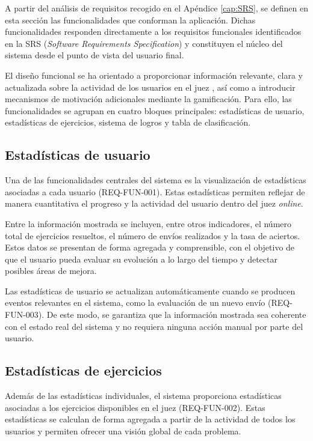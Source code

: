 A partir del análisis de requisitos recogido en el Apéndice \ref{cap:SRS}, se definen en esta sección las funcionalidades que conforman la aplicación. Dichas funcionalidades responden directamente a los requisitos funcionales identificados en la SRS (\textit{Software Requirements Specification}) y constituyen el núcleo del sistema desde el punto de vista del usuario final.

El diseño funcional se ha orientado a proporcionar información relevante, clara y actualizada sobre la actividad de los usuarios en el juez \aer, así como a introducir mecanismos de motivación adicionales mediante la gamificación. Para ello, las funcionalidades se agrupan en cuatro bloques principales: estadísticas de usuario, estadísticas de ejercicios, sistema de logros y tabla de clasificación.

\subsection{Estadísticas de usuario}

Una de las funcionalidades centrales del sistema es la visualización de estadísticas asociadas a cada usuario (REQ-FUN-001). Estas estadísticas permiten reflejar de manera cuantitativa el progreso y la actividad del usuario dentro del juez \textit{online}.

Entre la información mostrada se incluyen, entre otros indicadores, el número total de ejercicios resueltos, el número de envíos realizados y la tasa de aciertos. Estos datos se presentan de forma agregada y comprensible, con el objetivo de que el usuario pueda evaluar su evolución a lo largo del tiempo y detectar posibles áreas de mejora.

Las estadísticas de usuario se actualizan automáticamente cuando se producen eventos relevantes en el sistema, como la evaluación de un nuevo envío (REQ-FUN-003). De este modo, se garantiza que la información mostrada sea coherente con el estado real del sistema y no requiera ninguna acción manual por parte del usuario.

\subsection{Estadísticas de ejercicios}

Además de las estadísticas individuales, el sistema proporciona estadísticas asociadas a los ejercicios disponibles en el juez (REQ-FUN-002). Estas estadísticas se calculan de forma agregada a partir de la actividad de todos los usuarios y permiten ofrecer una visión global de cada problema.

